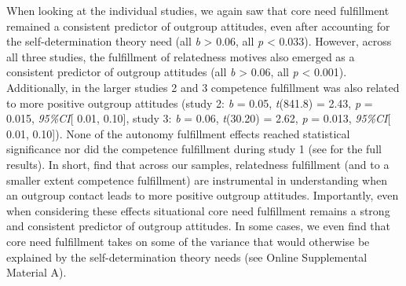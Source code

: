 When looking at the individual studies, we again saw that core need
fulfillment remained a consistent predictor of outgroup attitudes, even
after accounting for the self-determination theory need (all
\textbar{}\textit{b}\textbar{} \textgreater{} 0.06, all \textit{p}
\textless{} 0.033). However, across all three studies, the fulfillment of
relatedness motives also emerged as a consistent predictor of outgroup
attitudes (all \textbar{}\textit{b}\textbar{} \textgreater{} 0.06, all
\textit{p} \textless{} 0.001). Additionally, in the larger studies 2 and
3 competence fulfillment was also related to more positive outgroup
attitudes (study 2: \textit{b} = 0.05, \textit{t}(841.8) = 2.43,
\textit{p} = 0.015, \textit{95\%CI}{[} 0.01, 0.10{]}, study 3:
\textit{b} = 0.06, \textit{t}(30.20) = 2.62, \textit{p} = 0.013,
\textit{95\%CI}{[} 0.01, 0.10{]}). None of the autonomy fulfillment
effects reached statistical significance nor did the competence
fulfillment during study 1 (see  for the
full results). In short, find that across our samples, relatedness
fulfillment (and to a smaller extent competence fulfillment) are
instrumental in understanding when an outgroup contact leads to more
positive outgroup attitudes. Importantly, even when considering these
effects situational core need fulfillment remains a strong and
consistent predictor of outgroup attitudes. In some cases, we even find
that core need fulfillment takes on some of the variance that would
otherwise be explained by the self-determination theory needs (see
Online Supplemental Material A).
